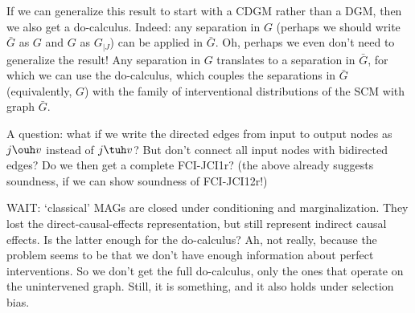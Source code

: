 \begin{Con}
  If we can generalize this result to start with a CDGM rather than a DGM, then we also get a do-calculus.
  Indeed: any separation in $G$ (perhaps we should write $\bar{G}$ as $G$ and $G$ as $G_{|J}$)
  can be applied in $\bar{G}$. Oh, perhaps we even don't need to generalize the result! Any separation in $G$
  translates to a separation in $\bar{G}$, for which we can use the do-calculus, which couples the separations
  in $\bar{G}$ (equivalently, $G$) with the family of interventional distributions of the SCM with graph $\bar{G}$.
\end{Con}  
\begin{Con}
  A question: what if we write the directed edges from input to output nodes as $j \ouh v$ instead of $j \tuh v$?
  But don't connect all input nodes with bidirected edges? 
  Do we then get a complete FCI-JCI1r? (the above already suggests soundness, if we can show soundness of FCI-JCI12r!)
\end{Con}
\begin{Con}
  WAIT: `classical' MAGs are closed under conditioning and marginalization. They lost the direct-causal-effects
  representation, but still represent indirect causal effects. Is the latter enough for the do-calculus? Ah, not
  really, because the problem seems to be that we don't have enough information about perfect interventions. So 
  we don't get the full do-calculus, only the ones that operate on the unintervened graph. Still, it is something,
  and it also holds under selection bias.
\end{Con}


